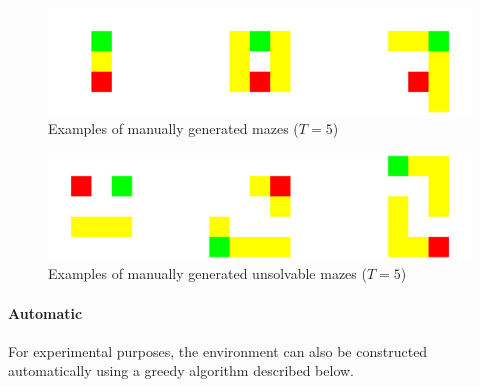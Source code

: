 \begin{figure}[h!]
\centering
\includegraphics[width=\textwidth]{images/manual_maze_gen.png}
\caption{Examples of manually generated mazes ($T=5$)}
\end{figure}

\begin{figure}[h!]
\centering
\includegraphics[width=\textwidth]{images/unsolvable_maze.png}
\caption{Examples of manually generated unsolvable mazes ($T=5$)}
\end{figure}

\newpage
\paragraph{Automatic}
For experimental purposes, the environment can also be constructed automatically using a greedy algorithm described below. 

